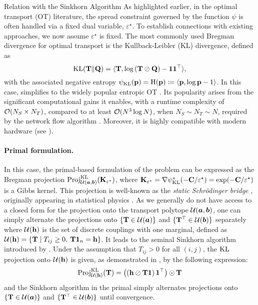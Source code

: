 \begin{mem1}{Relation with the Sinkhorn Algorithm}\label{mem:sinkhorn}
    As highlighted earlier, in the optimal transport (OT) literature, the spread constraint governed by the function $\psi$ is often handled via a fixed dual variable, $\varepsilon^\star$. To establish connections with existing approaches, we now assume $\varepsilon^\star$ is fixed. The most commonly used Bregman divergence for optimal transport is the Kullback-Leibler (KL) divergence, defined as
    \[
    \operatorname{KL}({\mathbf{T}} \| {\mathbf{Q}}) = \langle {\mathbf{T}}, \log \left( {\mathbf{T}} \oslash {\mathbf{Q}} \right) - \bm{1} \bm{1}^\top \rangle,
    \]
    with the associated negative entropy $\psi_{\operatorname{KL}}(\mathbf{p}) = \operatorname{H}({\mathbf{p}}) \coloneqq \langle \mathbf{p}, \log \mathbf{p} - 1 \rangle$.
    In this case,  simplifies to the widely popular entropic OT \citep{cuturi2013sinkhorn}. Its popularity arises from the significant computational gains it enables, with a runtime complexity of ${\mathcal{O}}(N_S \times N_T)$, compared to at least ${\mathcal{O}}(N^3 \log N)$, when $N_S \sim N_T \sim N$, required by the network flow algorithm \citep{peyre2019computational}. Moreover, it is highly compatible with modern hardware (see ).
    
    \paragraph{Primal formulation.}
    In this case, the primal-based formulation of the problem can be expressed as the Bregman projection $\operatorname{Proj}^{\operatorname{KL}}_{{\mathcal{U}}(\bm{a}, \bm{b})}({\mathbf{K}}_{\varepsilon^\star})$, where ${\mathbf{K}}_{\varepsilon^\star} = \nabla \psi_{\operatorname{KL}}^{*}(-{\mathbf{C}} / \varepsilon^\star) = \exp(-{\mathbf{C}} / \varepsilon^\star)$ is a Gibbs kernel. This projection is well-known as the \emph{static Schrödinger bridge} \citep{leonard2013survey}, originally appearing in statistical physics \citep{schrodinger1931umkehrung}.  As we generally do not have access to a closed form for the projection onto the transport polytope ${\mathcal{U}}(\bm{a}, \bm{b})$, one can simply alternate the projections onto $\{ {\mathbf{T}} \in {\mathcal{U}}(\bm{a}) \}$ and $\{ {\mathbf{T}}^\top \in {\mathcal{U}}(\bm{b}) \}$ separately where ${\mathcal{U}}({\mathbf{h}})$ is the set of discrete couplings with one marginal, defined as ${\mathcal{U}}({\mathbf{h}}) = \left\{{\mathbf{T}} \mid T_{ij} \geq 0, \: {\mathbf{T}} \mathbf{1}_n = {\mathbf{h}} \right\}$. It leads to the seminal Sinkhorn algorithm introduced by \cite{cuturi2013sinkhorn}.
    Under the assumption that $T_{ij} > 0$ for all $(i, j)$, the $\operatorname{KL}$ projection onto ${\mathcal{U}}({\mathbf{h}})$ is given, as demonstrated in \citep{cuturi2013sinkhorn}, by the following expression:
    \begin{align}
        \operatorname{Proj}^{\operatorname{KL}}_{{\mathcal{U}}({\mathbf{h}})}({\mathbf{T}}) = \left(\left({\mathbf{h}} \oslash {\mathbf{T}} \bm{1}  \right) \bm{1}^\top \right) \odot {\mathbf{T}}
    \end{align}
    and the Sinkhorn algorithm in the primal simply alternates projections onto $\{ {\mathbf{T}} \in {\mathcal{U}}(\bm{a}) \}$ and $\{ {\mathbf{T}}^\top \in {\mathcal{U}}(\bm{b}) \}$ until convergence.


\end{mem1}
